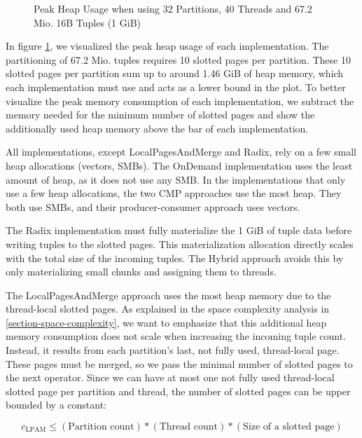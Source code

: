 \begin{figure}[h]
  \centering
  \resizebox{\linewidth}{!}{}
  \caption{Peak Heap Usage when using 32 Partitions, 40 Threads and 67.2 Mio.
    16B Tuples (1 GiB)} \label{plot-heap-16B-P32-Th40} \end{figure}
In figure \ref{plot-heap-16B-P32-Th40}, we visualized the peak heap usage of each implementation.
The partitioning of 67.2 Mio.
tuples requires 10 slotted pages per partition.
These 10 slotted pages per partition sum up to around 1.46 GiB of heap memory, which each implementation must use and acts as a lower bound in the plot.
To better visualize the peak memory consumption of each implementation, we subtract the memory needed for the minimum number of slotted pages and show the additionally used heap memory above the bar of each implementation.

All implementations, except Local\-Pages\-And\-Merge and Radix, rely on a few small heap allocations (vectors, SMBs).
The OnDemand implementation uses the least amount of heap, as it does not use any \ac{SMB}.
In the implementations that only use a few heap allocations, the two \ac{CMP} approaches use the most heap.
They both use \acp{SMB}, and their producer-consumer approach uses vectors.

The Radix implementation must fully materialize the 1 GiB of tuple data before writing tuples to the slotted pages.
This materialization allocation directly scales with the total size of the incoming tuples.
The Hybrid approach avoids this by only materializing small chunks and assigning them to threads.

The Local\-Pages\-And\-Merge approach uses the most heap memory due to the thread-local slotted pages.
As explained in the space complexity analysis in \ref{section-space-complexity}, we want to emphasize that this additional heap memory consumption does not scale when increasing the incoming tuple count.
Instead, it results from each partition's last, not fully used, thread-local page.
These pages must be merged, so we pass the minimal number of slotted pages to the next operator.
Since we can have at most one not fully used thread-local slotted page per partition and thread, the number of slotted pages can be upper bounded by a constant:

\begin{equation} c_\textrm{LPAM} \leq (\textrm{Partition count}) * (\textrm{Thread count}) * (\textrm{Size of a slotted page}) \end{equation}

